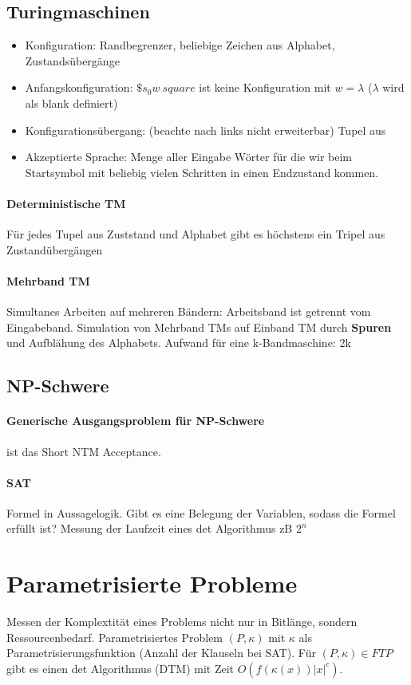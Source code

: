 \documentclass[ngerman]{scrartcl}
\begin{document}
\subsection{Turingmaschinen}
\begin{itemize}
    \item Konfiguration: Randbegrenzer, beliebige Zeichen aus Alphabet, Zustandsübergänge
    \item Anfangskonfiguration: $ \$ s_0 w\ square $ ist keine Konfiguration mit $ w = \lambda $ ($ \lambda $ wird als blank definiert)
    \item Konfigurationsübergang: (beachte nach links nicht erweiterbar) Tupel aus 
    \item Akzeptierte Sprache: Menge aller Eingabe Wörter für die wir beim Startsymbol mit beliebig vielen Schritten in einen Endzustand kommen.
\end{itemize}

\paragraph{Deterministische TM} Für jedes Tupel aus Zuststand und Alphabet gibt es höchstens ein Tripel aus Zustandübergängen

\paragraph{Mehrband TM} Simultanes Arbeiten auf mehreren Bändern: Arbeitsband ist getrennt vom Eingabeband. Simulation von Mehrband TMs auf Einband TM durch \textbf{Spuren} und Aufblähung des Alphabets. Aufwand für eine k-Bandmaschine: 2k 

\subsection{NP-Schwere}
\paragraph{Generische Ausgangsproblem für NP-Schwere} ist das Short NTM Acceptance. 
\paragraph{SAT} Formel in Aussagelogik. Gibt es eine Belegung der Variablen, sodass die Formel erfüllt ist? Messung der Laufzeit eines det Algorithmus zB $ 2^n $


\section{Parametrisierte Probleme}
Messen der Komplextität eines Problems nicht nur in Bitlänge, sondern Ressourcenbedarf. Parametrisiertes Problem $ (P, \kappa) $ mit $ \kappa $ als Parametrisierungsfunktion (Anzahl der Klauseln bei SAT).  Für $ (P, \kappa) \in FTP$ gibt es einen det Algorithmus (DTM) mit Zeit $ O(f(\kappa(x))|x|^c) $.
\end{document}
